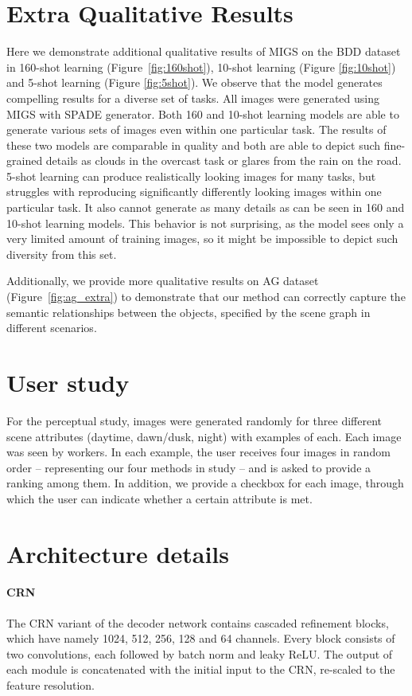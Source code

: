 \documentclass{bmvc2k}
\begin{document}
\section{Extra Qualitative Results}

Here we demonstrate additional qualitative results of MIGS on the BDD dataset in 160-shot learning (Figure~\ref{fig:160shot}), 10-shot learning (Figure \ref{fig:10shot}) and 5-shot learning (Figure \ref{fig:5shot}). We observe that the model generates compelling results for a diverse set of tasks. All images were generated using MIGS with SPADE generator. Both 160 and 10-shot learning models are able to generate various sets of images even within one particular task. The results of these two models are comparable in quality and both are able to depict such fine-grained details as clouds in the overcast task or glares from the rain on the road. 5-shot learning can produce realistically looking images for many tasks, but struggles with reproducing significantly differently looking images within one particular task. It also cannot generate as many details as can be seen in 160 and 10-shot learning models. This behavior is not surprising, as the model sees only a very limited amount of training images, so it might be impossible to depict such diversity from this set.

Additionally, we provide more qualitative results on AG dataset (Figure~\ref{fig:ag_extra}) to demonstrate that our method can correctly capture the semantic relationships between the objects, specified by the scene graph in different scenarios.

\section{User study}
For the perceptual study,  images were generated randomly for three different scene attributes (daytime, dawn/dusk, night) with  examples of each. Each image was seen by  workers. In each example, the user receives four images in random order -- representing our four methods in study -- and is asked to provide a ranking among them. In addition, we provide a checkbox for each image, through which the user can indicate whether a certain attribute is met. 

\section{Architecture details}

\paragraph{CRN} The CRN variant of the decoder network contains  cascaded refinement blocks, which have namely 1024, 512, 256, 128 and 64 channels. 
Every block consists of two  convolutions, each followed by batch norm and leaky ReLU. The output of each module is concatenated with the initial input to the CRN, re-scaled to the feature resolution.
\end{document}
